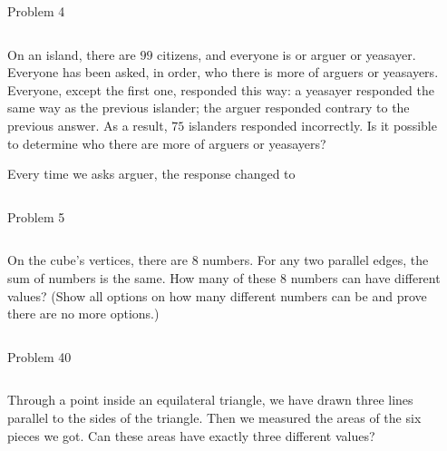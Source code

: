 \documentclass[9pt,aspectratio=169]{beamer}
\begin{document}
\begin{frame}{Problem 4}
  \begin{columns}[T]
    \begin{column}{0.5\textwidth}
      \begin{problem}
        On an island, there are $99$ citizens, and everyone is or arguer or yeasayer. Everyone has been asked, in order, who there is more of arguers or yeasayers. Everyone, except the first one, responded this way: a yeasayer responded the same way as the previous islander; the arguer responded contrary to the previous answer. As a result, $75$ islanders responded incorrectly. Is it possible to determine who there are more of arguers or yeasayers?
      \end{problem}
      Every time we asks arguer, the response changed to
      
    \end{column}
    \begin{column}{0.5\textwidth}
      
    \end{column}
  \end{columns}
\end{frame}

\begin{frame}{Problem 5}
  \begin{columns}[T]
    \begin{column}{0.5\textwidth}
      \begin{problem}
        On the cube's vertices, there are $8$ numbers. For any two parallel edges, the sum of numbers is the same. How many of these $8$ numbers can have different values? (Show all options on how many different numbers can be and prove there are no more options.)
      \end{problem}
    \end{column}
    \begin{column}{0.5\textwidth}
      
    \end{column}
  \end{columns}
\end{frame}

\begin{frame}{Problem 40}
  \begin{columns}[T]
    \begin{column}{0.5\textwidth}
      \begin{problem}
        Through a point inside an equilateral triangle, we have drawn three lines parallel to the sides of the triangle. Then we measured the areas of the six pieces we got. Can these areas have exactly three different values?
      \end{problem}
    \end{column}
    \begin{column}{0.5\textwidth}
    \end{column}
  \end{columns}
\end{frame}

\end{document}
